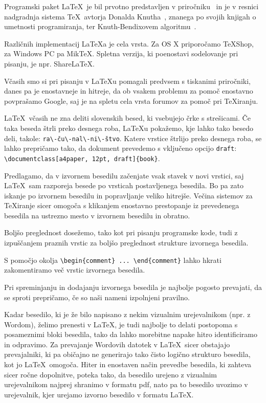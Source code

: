 \documentclass[a4paper, 12pt]{book}
\begin{document}
Programski paket \LaTeX\ je bil prvotno predstavljen v priročniku~\cite{lamport} in je v resnici nadgradnja sistema \TeX\ avtorja Donalda Knutha~\cite{knuth}, 
znanega po svojih knjigah o umetnosti programiranja, 
ter Knuth-Bendixovem algoritmu~\cite{knuth1983simple}.

Različnih implementacij \LaTeX{}a je cela vrsta.
Za OS X priporočamo TeXShop, za Windows PC pa MikTeX. Spletna verzija, ki poenostavi sodelovanje pri pisanju, je npr. ShareLaTeX.

Včasih smo si pri pisanju v \LaTeX{}u  pomagali predvsem s tiskanimi pri\-ro\-čni\-ki, danes pa je enostavneje in hitreje, da ob vsakem problemu za pomoč enostavno povprašamo Google, 
saj je na spletu cela vrsta forumov za pomoč pri \TeX{}iranju.

\LaTeX\ včasih ne zna deliti slovenskih besed, ki vsebujejo črke s strešicami. 
Če taka beseda štrli preko desnega roba,  \LaTeX{}u pokažemo, kje lahko tako besedo deli, takole: \verb=ra\-ču\-nal\-ni\-štvo=.
Katere vrstice štrlijo preko desnega roba, se lahko prepričamo tako, da dokument prevedemo s vključeno opcijo \texttt{draft}: \verb=\documentclass[a4paper, 12pt, draft]{book}=.


Predlagamo, da v izvornem besedilu začenjate vsak stavek v novi vrstici, saj \LaTeX\ sam razporeja besede po vrsticah postavljenega besedila. 
Bo pa zato iskanje po izvornem besedilu in popravljanje veliko hitrejše. 
Večina sistemov za \TeX{}iranje sicer omogoča s klikanjem enostavno prestopanje  iz prevedenega besedila na ustrezno mesto v izvornem besedilu in obratno.

Boljšo preglednost dosežemo, tako kot pri pisanju programske kode, tudi z izpuščanjem praznih vrstic za boljšo preglednost strukture izvornega besedila.

S pomočjo  okolja \verb=\begin{comment} ... \end{comment}= lahko  hkrati zakomentiramo več vrstic izvornega besedila.

Pri spreminjanju in dodajanju izvornega besedila je najbolje pogosto prevajati, da se sproti prepričamo, če so naši nameni izpolnjeni pravilno.

Kadar besedilo, ki je že bilo napisano z nekim vizualnim urejevalnikom (npr. z Wordom), želimo prenesti v \LaTeX, je tudi najbolje to delati postopoma s posameznimi bloki besedila, 
tako da lahko morebitne napake hitro identificiramo in odpravimo.
Za prevajanje Wordovih datotek v \LaTeX\ sicer obstajajo prevajalniki, ki pa običajno ne generirajo tako čisto logično strukturo besedila, kot jo  \LaTeX\ omogoča.
Hiter in enostaven način prevedbe besedila, ki  zahteva sicer ročne dopolnitve, poteka tako, da besedilo urejeno z vizualnim urejevalnikom najprej shranimo v formatu pdf, 
nato pa to besedilo uvozimo v urejevalnik, kjer urejamo izvorno besedilo v formatu \LaTeX.
\end{document}
